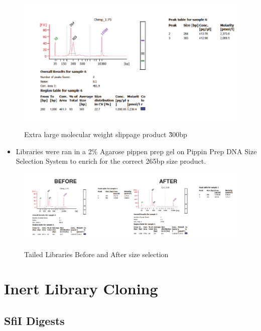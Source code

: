 \documentclass[a4paper]{article}
\begin{document}
        \begin{figure}[H]
			\centering
			\includegraphics[width=1.0\textwidth]{Size_Issue.pdf}
			\label{fig:Bioanalyzer trace}
			\caption{Extra large molecular weight slippage product \~300bp}
        \end{figure}
        \begin{itemize}
    	
        	\item Libraries were ran in a 2\% Agarose pippen prep gel on Pippin Prep DNA Size Selection System to enrich for the correct 265bp size product.
        
        \end{itemize}
        
        \begin{figure}[H]
			\centering
			\includegraphics[width=1.0\textwidth]{Size_Select.pdf}
			\label{fig:Size Select}
			\caption{Tailed Libraries Before and After size selection}
        \end{figure}
        
\section{Inert Library Cloning}    
    \subsection{SfiI Digests}
    	
\end{document}
